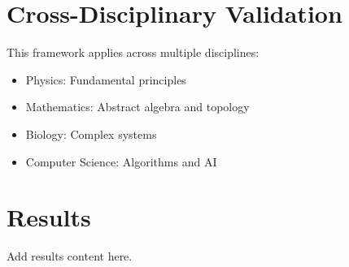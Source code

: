 \documentclass[11pt]{article}
\begin{document}
\section{Cross-Disciplinary Validation}

This framework applies across multiple disciplines:
\begin{itemize}
    \item Physics: Fundamental principles
    \item Mathematics: Abstract algebra and topology
    \item Biology: Complex systems
    \item Computer Science: Algorithms and AI
\end{itemize}

\section{Results}
\label{sec:results}

Add results content here.
\end{document}

